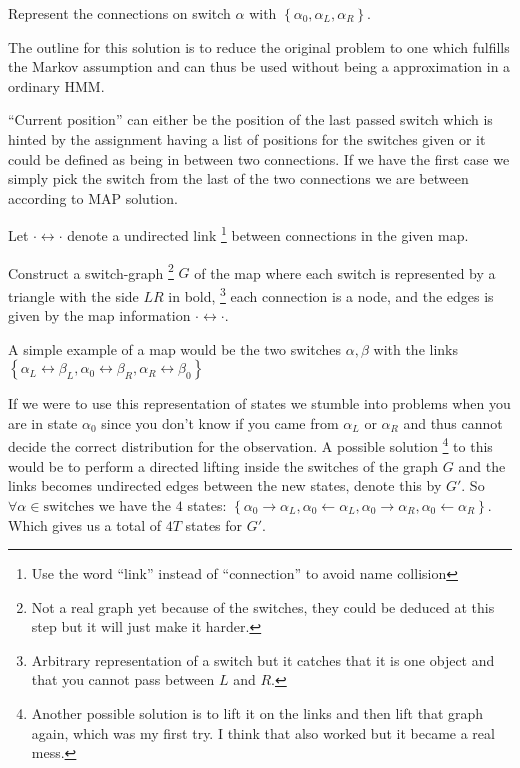 \documentclass[a4paper,twoside=false,abstract=false,numbers=noenddot,
titlepage=false,headings=small,parskip=half,version=last]{scrartcl}
\begin{document}
\begin{solution}
    Represent the connections on switch $\alpha$ with 
    $\left\{\alpha_0,\alpha_L,\alpha_R\right\}$. 

    The outline for this solution is to reduce the original problem to one
    which fulfills the Markov assumption and can thus be used without being a
    approximation in a ordinary HMM.

    ``Current position'' can either be the position of the last passed switch
    which is hinted by the assignment having a list of positions for the
    switches given or it could be defined as being in between two connections.
    If we have the first case we simply pick the switch from the last of the
    two connections we are between according to MAP solution. 

    Let $\cdot\leftrightarrow\cdot$ denote a undirected link
    \footnote{Use the word ``link'' instead of ``connection'' to avoid 
    name collision}
    between connections in the given map.

    Construct a switch-graph
    \footnote{Not a real graph yet because of the
    switches, they could be deduced at this step but it will just make it
    harder.}
    $G$ of the map where each switch is represented by a triangle with the
    side $LR$ in bold,
    \footnote{Arbitrary representation of a switch but it catches that it is
    one object and that you cannot pass between $L$ and $R$.} 
    each connection is a node, and the edges is given by the map information
    $\cdot\leftrightarrow\cdot$. 

    A simple example of a map would be the two switches $\alpha,\beta$ with the
    links 
    $\left\{
        \alpha_L\leftrightarrow\beta_L,
        \alpha_0\leftrightarrow\beta_R,
        \alpha_R\leftrightarrow\beta_0
    \right\}$

    If we were to use this representation of states we stumble into
    problems when you are in state $\alpha_0$ since you don't know if you came
    from $\alpha_L$ or $\alpha_R$ and thus cannot decide the correct 
    distribution for the observation. A possible solution
    \footnote{Another possible solution is to lift it on the links and then
    lift that graph again, which was my first try. I think that also worked but
    it became a real mess.}
    to this would be to
    perform a directed lifting inside the switches of the graph $G$ and the
    links becomes undirected edges between the new states, denote 
    this by $G'$.
    So $\forall \alpha \in \text{switches}$ we have the $4$ states:
    $\left\{
        \alpha_0\rightarrow\alpha_L,
        \alpha_0\leftarrow\alpha_L,
        \alpha_0\rightarrow\alpha_R,
        \alpha_0\leftarrow\alpha_R
    \right\}$.
    Which gives us a total of $4T$ states for $G'$.


\end{solution}
\end{document}
